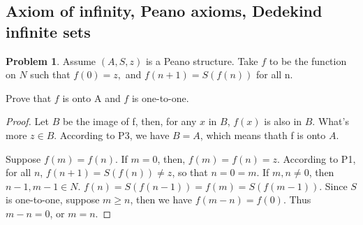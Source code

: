 \documentclass[a4paper,11pt]{article}%
\theoremstyle{remark}
\theoremstyle{definition}
\newtheorem{problem}{Problem}[subsection]
\begin{document}
\subsection{Axiom of infinity, Peano axioms, Dedekind infinite sets}
\begin{problem}
    Assume $(A,S,z)$ is a Peano structure. Take $f$ to be the function on $N$ such that 
    $f(0)=z,$ and $f(n+1)=S(f(n))$ for all n.

    Prove that $f$ is onto A and $f$ is one-to-one.

    \begin{proof}
        Let $B$ be the image of f, then, for any $x$ in $B$, $f(x)$ is also in $B$. What's more $z\in B$.
        According to P3, we have $B=A$, which means thath f is onto $A$.

        Suppose $f(m)=f(n)$. If $m=0$, then, $f(m)=f(n)=z$. According to P1, for all $n$, 
        $f(n+1)=S(f(n))\neq z$, so that $n=0=m$. If $m,n\neq 0$, then $n-1,m-1\in N$.
        $f(n)=S(f(n-1))=f(m)=S(f(m-1))$. Since $S$ is one-to-one, suppose $m\geq n$, then we have $f(m-n)=f(0)$.
        Thus $m-n=0$, or $m=n$.
    \end{proof}
\end{problem}
\end{document}

